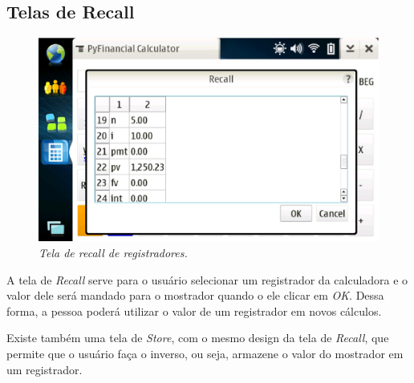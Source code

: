 \subsection{Telas de Recall}

\begin{figure}[!h]
 \includegraphics[scale=0.6]{tela_recall.eps}
 \caption{\it Tela de \textit{recall} de registradores.} \label{tab:tela_recall}
\end{figure}

A tela de \textit{Recall} serve para o usuário selecionar um registrador da calculadora e o valor
dele será mandado para o mostrador quando o ele clicar em \textit{OK}. Dessa forma, a pessoa poderá
utilizar o valor de um registrador em novos cálculos.

Existe também uma tela de \textit{Store}, com o mesmo design da tela de \textit{Recall}, que permite que o
usuário faça o inverso, ou seja, armazene o valor do mostrador em um registrador.
